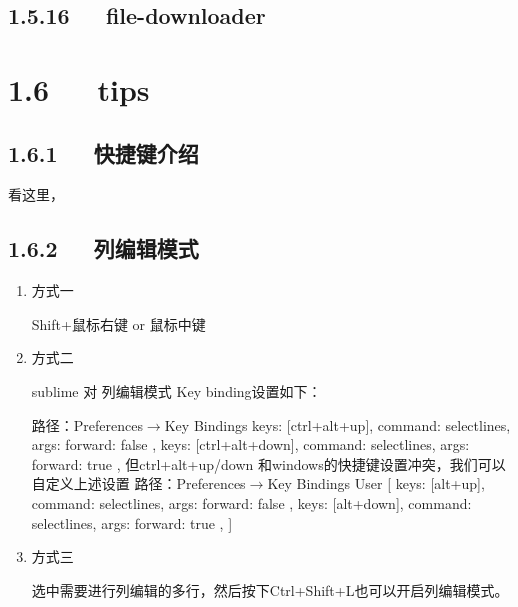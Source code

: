\documentclass[letterpaper,12pt,english]{sphinxmanual}
\begin{document}
\subsection{1.5.16   file-downloader}
\label{\detokenize{001software/001install/sublime:file-downloader}}

\section{1.6   tips}
\label{\detokenize{001software/001install/sublime:tips}}

\subsection{1.6.1   快捷键介绍}
\label{\detokenize{001software/001install/sublime:id4}}
看这里，


\subsection{1.6.2   列编辑模式}
\label{\detokenize{001software/001install/sublime:id5}}\begin{enumerate}
%
\item {} 
方式一

Shift+鼠标右键 or 鼠标中键

\item {} 
方式二

sublime 对 列编辑模式 Key binding设置如下：

\begin{sphinxVerbatim}[commandchars=\\\{\}]
路径：Preferences\(\rightarrow\)Key Bindings
   \PYGZob{} \PYGZdq{}keys\PYGZdq{}: [\PYGZdq{}ctrl+alt+up\PYGZdq{}], \PYGZdq{}command\PYGZdq{}: \PYGZdq{}select\PYGZus{}lines\PYGZdq{}, \PYGZdq{}args\PYGZdq{}: \PYGZob{}\PYGZdq{}forward\PYGZdq{}: false\PYGZcb{} \PYGZcb{},
   \PYGZob{} \PYGZdq{}keys\PYGZdq{}: [\PYGZdq{}ctrl+alt+down\PYGZdq{}], \PYGZdq{}command\PYGZdq{}: \PYGZdq{}select\PYGZus{}lines\PYGZdq{}, \PYGZdq{}args\PYGZdq{}: \PYGZob{}\PYGZdq{}forward\PYGZdq{}: true\PYGZcb{} \PYGZcb{},
但ctrl+alt+up/down 和windows的快捷键设置冲突，我们可以自定义上述设置
路径：Preferences\(\rightarrow\)Key Bindings \textendash{} User
[\PYGZob{} \PYGZdq{}keys\PYGZdq{}: [\PYGZdq{}alt+up\PYGZdq{}], \PYGZdq{}command\PYGZdq{}: \PYGZdq{}select\PYGZus{}lines\PYGZdq{}, \PYGZdq{}args\PYGZdq{}: \PYGZob{}\PYGZdq{}forward\PYGZdq{}: false\PYGZcb{} \PYGZcb{},
 \PYGZob{} \PYGZdq{}keys\PYGZdq{}: [\PYGZdq{}alt+down\PYGZdq{}], \PYGZdq{}command\PYGZdq{}: \PYGZdq{}select\PYGZus{}lines\PYGZdq{}, \PYGZdq{}args\PYGZdq{}: \PYGZob{}\PYGZdq{}forward\PYGZdq{}: true\PYGZcb{} \PYGZcb{},
]
\end{sphinxVerbatim}

\item {} 
方式三

选中需要进行列编辑的多行，然后按下Ctrl+Shift+L也可以开启列编辑模式。

\end{enumerate}
\end{document}
